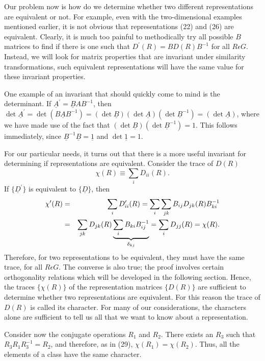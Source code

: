 Our problem now is how do we determine whether two different 
representations are equivalent or not.  For example, even with the 
two-dimensional examples mentioned earlier, it is not obvious that 
representations (22) and (26) are equivalent.  Clearly, it is much too 
painful to methodically try all possible $B$ matrices to find if there 
is one such that $D^{\prime}(R) = BD(R)B^{-1}$ for all $R \epsilon 
G$.  Instead, we will look for matrix properties that are invariant 
under similarity transformations, such equivalent representations 
will have the same value for these invariant properties.

One example of an invariant that should quickly come to mind is the 
determinant. If $\underline{A}^{\prime} = \underline{B}AB^{-1}$, then
$\det \underline{A}^{\prime} = \det ( \underline{BAB}^{-1}) = ( \det 
\underline{B}) (\det \underline{A}) (\det \underline{B}^{-1}) = (\det 
\underline{A})$, where we have made use of the fact that $(\det 
\underline{B}) (\det \underline{B}^{-1}) = 1$.  This follows 
immediately, since $\underline{B}^{-1}\underline{B} = \underline{1}$ 
and $\det \underline{1} = 1$.

For our particular needs, it turns out that there is a more useful 
invariant for determining if representations are equivalent.  
Consider the trace of $D(R)$
\begin{equation}
\chi(R) \equiv \sum_{i} D_{ii}(R).
\end{equation}
If $\{ \underline{D}^{\prime}\}$ is equivalent to $\{ 
\underline{D}\}$, then
\begin{eqnarray}
\chi^{\prime} (R) &=& \sum_{i} D^{\prime}_{ii}(R) = \sum_{i} \sum_{jk} 
B_{ij} D_{jk} (R) B^{-1}_{ki}\cr
&=& \sum_{jk} D_{jk} (R) 
\underbrace{\sum_{i} B_{ki}B_{ij}^{-1}}_{\delta_{kj}} = \sum_{i} 
D_{jj}(R) = \chi(R).
\label{chap16-eqno29}
\end{eqnarray}
Therefore, for two representations to be equivalent, they must have 
the same trace, for all $R \epsilon G$.  The converse is also true; 
the proof involves certain orthogonality relations which will be 
developed in the following section.  Hence, the traces $\{ \chi(R)\}$ 
of the representation matrices $\{D(R)\}$ are sufficient to determine 
whether two representations are equivalent.  For this reason the trace 
of $D(R)$ is called its character.  For many of our considerations, 
the characters alone are sufficient to tell us all that we want to know 
about a representation.

Consider now the conjugate operations $R_1$ and $R_2$.  There exists 
an $R_3$ such that $R_3 R_1R_3^{-1} = R_2$, and therefore, as in 
(29), $\chi(R_1) = \chi(R_2)$.  Thus, all the elements of a class 
have the same character.


